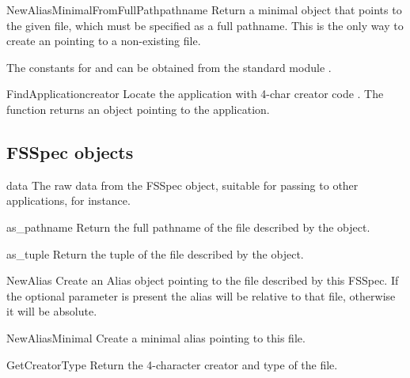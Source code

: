 \begin{funcdesc}{NewAliasMinimalFromFullPath}{pathname}
Return a minimal  object that points to the given file, which
must be specified as a full pathname. This is the only way to create an
 pointing to a non-existing file.

The constants for  and  can be obtained from the
standard module .
\end{funcdesc}

\begin{funcdesc}{FindApplication}{creator}
Locate the application with 4-char creator code . The
function returns an  object pointing to the application.
\end{funcdesc}


\subsection{FSSpec objects \label{fsspec-objects}}

\begin{memberdesc}[FSSpec]{data}
The raw data from the FSSpec object, suitable for passing
to other applications, for instance.
\end{memberdesc}

\begin{methoddesc}[FSSpec]{as_pathname}{}
Return the full pathname of the file described by the 
object.
\end{methoddesc}

\begin{methoddesc}[FSSpec]{as_tuple}{}
Return the  tuple of
the file described by the  object.
\end{methoddesc}

\begin{methoddesc}[FSSpec]{NewAlias}{}
Create an Alias object pointing to the file described by this
FSSpec. If the optional  parameter is present the alias
will be relative to that file, otherwise it will be absolute.
\end{methoddesc}

\begin{methoddesc}[FSSpec]{NewAliasMinimal}{}
Create a minimal alias pointing to this file.
\end{methoddesc}

\begin{methoddesc}[FSSpec]{GetCreatorType}{}
Return the 4-character creator and type of the file.
\end{methoddesc}

